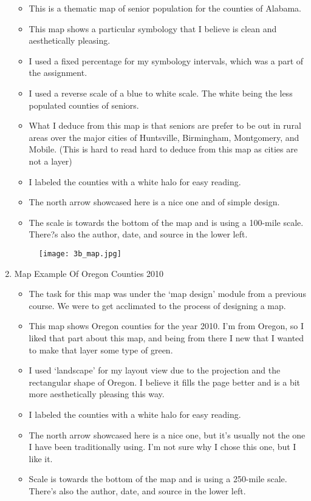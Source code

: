 \documentclass{article}
\begin{document}
\begin{enumerate}
	\begin{itemize}
	\item This is a thematic map of senior population for the counties of Alabama. 
	\item This map shows a particular symbology that I believe is clean and aesthetically pleasing.  
	\item I used a fixed percentage for my symbology intervals, which was a part of the 
assignment. 
	\item I used a reverse scale of a blue to white scale.  The white being the less populated counties of seniors.
	\item What I deduce from this map is that seniors are prefer to be out in rural areas over the major cities of Huntsville, Birmingham, Montgomery, and Mobile. (This is hard to read hard to deduce from this map as cities are not a layer)
	\item I labeled the counties with a white halo for easy reading. 
	\item The north arrow showcased here is a nice one and of simple design.
	\item The scale is towards the bottom of the map and is using a 100-mile scale. There?s also the author, date, and source in the lower left.
		
	\end{itemize}		
			\begin{figure}[H]
				\centering
				\texttt{[image: 3b\_map.jpg]}
				\caption{}
				\label{fig:method}
				\end{figure}
	
\newpage		





\item Map Example Of Oregon Counties 2010
	\begin{itemize}
	\item The task for this map was under the `map design' module from a previous course. We were to get acclimated to the process of designing a map. 
	\item This map shows Oregon counties for the year 2010. I'm from Oregon, so I liked that part about this map, and being from there I new that I wanted to make that layer some type of green. 
	\item I used `landscape' for my layout view due to the projection and the rectangular shape of Oregon. I believe it fills the page better and is a bit more aesthetically pleasing this way.
	\item I labeled the counties with a white halo for easy reading. 
	\item The north arrow showcased here is a nice one, but it's usually not the one I have been traditionally using. I'm not sure why I chose this one, but I like it.
	\item Scale is towards the bottom of the map and is using a 250-mile scale. There's also the author, date, and source in the lower left.
	

\end{itemize}
\end{enumerate}
\end{document}
